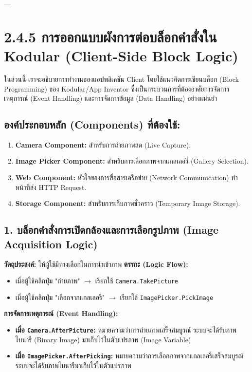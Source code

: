 \documentclass[11pt,a4paper,openany]{report}
\begin{document}
---

\section{2.4.5 การออกแบบผังการต่อบล็อกคำสั่งใน Kodular (Client-Side Block Logic)}


ในส่วนนี้ เราจะอธิบายการทำงานของแอปพลิเคชัน Client โดยใช้แนวคิดการเขียนบล็อก (Block Programming) ของ Kodular/App Inventor ซึ่งเป็นกระบวนการที่ต้องอาศัยการจัดการเหตุการณ์ (Event Handling) และการจัดการข้อมูล (Data Handling) อย่างแม่นยำ

\subsection{องค์ประกอบหลัก (Components) ที่ต้องใช้:}

\begin{enumerate}
  \item \textbf{Camera Component:} สำหรับการถ่ายภาพสด (Live Capture).
  \item \textbf{Image Picker Component:} สำหรับการเลือกภาพจากแกลเลอรี่ (Gallery Selection).
  \item \textbf{Web Component:} หัวใจของการสื่อสารเครือข่าย (Network Communication) ทำหน้าที่ส่ง HTTP Request.
  \item \textbf{Storage Component:} สำหรับการเก็บภาพชั่วคราว (Temporary Image Storage).
\end{enumerate}


\subsection{1. บล็อกคำสั่งการเปิดกล้องและการเลือกรูปภาพ (Image Acquisition Logic)}


\textbf{วัตถุประสงค์:} ให้ผู้ใช้มีทางเลือกในการนำเข้าภาพ
\textbf{ตรรกะ (Logic Flow):}
\begin{itemize}
  \item เมื่อผู้ใช้คลิกปุ่ม "ถ่ายภาพ" $\rightarrow$ เรียกใช้ \texttt{Camera.TakePicture}
  \item เมื่อผู้ใช้คลิกปุ่ม "เลือกจากแกลเลอรี่" $\rightarrow$ เรียกใช้ \texttt{ImagePicker.PickImage}
\end{itemize}


\textbf{การจัดการเหตุการณ์ (Event Handling):}
\begin{itemize}
  \item \textbf{เมื่อ \texttt{Camera.AfterPicture}:} หมายความว่าการถ่ายภาพเสร็จสมบูรณ์ ระบบจะได้รับภาพไบนารี (Binary Image) มาเก็บไว้ในตัวแปรภาพ (Image Variable)
  \item \textbf{เมื่อ \texttt{ImagePicker.AfterPicking}:} หมายความว่าการเลือกภาพจากแกลเลอรี่เสร็จสมบูรณ์ ระบบจะได้รับภาพไบนารีมาเก็บไว้ในตัวแปรภาพ
\end{itemize}
\end{document}
